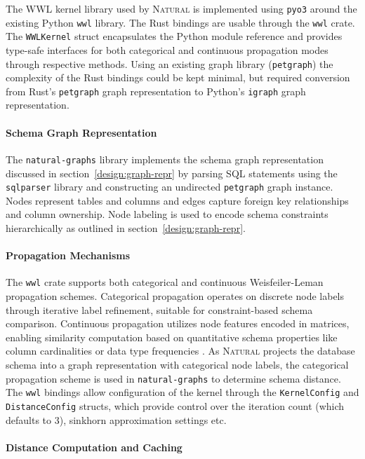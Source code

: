 The WWL kernel library used by \textsc{Natural} is implemented using
\texttt{pyo3} around the existing Python \texttt{wwl} library. The Rust
bindings are usable through the \texttt{wwl} crate. The \texttt{WWLKernel}
struct encapsulates the Python module reference and provides type-safe interfaces for
both categorical and continuous propagation modes through respective methods.
Using an existing graph library (\texttt{petgraph}) the complexity of the Rust
bindings could be kept minimal, but required conversion from Rust's
\texttt{petgraph} graph representation to Python's \texttt{igraph} graph
representation. 

\paragraph{Schema Graph Representation}

The \texttt{natural-graphs} library implements the schema graph representation
discussed in section~\ref{design:graph-repr} by parsing SQL statements using the
\texttt{sqlparser} library and constructing an undirected \texttt{petgraph}
graph instance. Nodes represent tables and columns and edges capture foreign
key relationships and column ownership. Node labeling is used to encode schema
constraints hierarchically as outlined in section~\ref{design:graph-repr}.

\paragraph{Propagation Mechanisms}

The \texttt{wwl} crate supports both categorical and continuous Weisfeiler-Leman
propagation schemes. Categorical propagation operates on discrete node labels
through iterative label refinement, suitable for constraint-based schema
comparison. Continuous propagation utilizes node features encoded in matrices,
enabling similarity computation based on quantitative schema properties like
column cardinalities or data type frequencies \citep{WWL}. As \textsc{Natural}
projects the database schema into a graph representation with categorical node
labels, the categorical propagation scheme is used in \texttt{natural-graphs}
to determine schema distance. The \texttt{wwl} bindings allow configuration of
the kernel through the \texttt{KernelConfig} and \texttt{DistanceConfig}
structs, which provide control over the iteration count (which defaults to 3),
sinkhorn approximation settings etc. 

\paragraph{Distance Computation and Caching}

